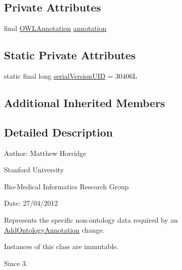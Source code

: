 \subsection*{Private Attributes}
\begin{DoxyCompactItemize}
\item 
final \hyperlink{interfaceorg_1_1semanticweb_1_1owlapi_1_1model_1_1_o_w_l_annotation}{O\-W\-L\-Annotation} \hyperlink{classorg_1_1semanticweb_1_1owlapi_1_1change_1_1_ontology_annotation_change_data_a9adc959d9ad5bcdce1eee5141c22e3af}{annotation}
\end{DoxyCompactItemize}
\subsection*{Static Private Attributes}
\begin{DoxyCompactItemize}
\item 
static final long \hyperlink{classorg_1_1semanticweb_1_1owlapi_1_1change_1_1_ontology_annotation_change_data_afe5edce9c663d2212beaa81bf0803e53}{serial\-Version\-U\-I\-D} = 30406\-L
\end{DoxyCompactItemize}
\subsection*{Additional Inherited Members}


\subsection{Detailed Description}
Author\-: Matthew Horridge\par
 Stanford University\par
 Bio-\/\-Medical Informatics Research Group\par
 Date\-: 27/04/2012 

Represents the specific non-\/ontology data required by an \hyperlink{}{Add\-Ontology\-Annotation} change. 

Instances of this class are immutable. 

\begin{DoxySince}{Since}
3. 
\end{DoxySince}


